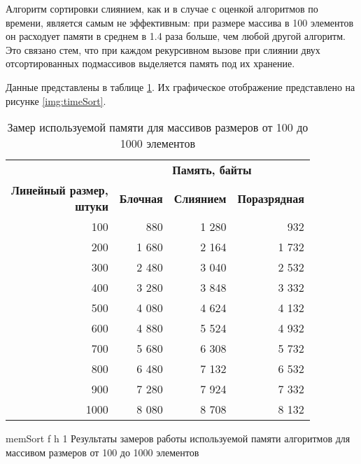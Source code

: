 Алгоритм сортировки слиянием, как и в случае с оценкой алгоритмов по времени,
является самым не эффективным: при размере массива в 100 элементов он расходует памяти в среднем в 1.4 раза больше, чем любой другой алгоритм. Это связано стем, что при каждом рекурсивном вызове при слиянии двух отсортированных подмассивов выделяется память под их хранение.

Данные представлены в таблице \ref{tbl:mem}. Их графическое отображение представлено на рисунке \ref{img:timeSort}.

\begin{table}[ht]
	\small
	\begin{center}
		\begin{threeparttable}
			\caption{Замер используемой памяти для массивов размеров от 100 до 1000 элементов}
			\label{tbl:mem}
			\begin{tabular}{|r|r|r|r|}
				\hline
				& \multicolumn{3}{c|}{\bfseries Память, байты} \\ \cline{2-4}
				\bfseries \makecell{Линейный размер, \\ штуки} & \bfseries Блочная & \bfseries Слиянием & \bfseries Поразрядная \\ \cline{2-4}
				\hline
				100 & 880 & 1 280 & 932 \\
				\hline
				200 & 1 680 & 2 164 & 1 732 \\
				\hline
				300 & 2 480 & 3 040 & 2 532 \\
				\hline
				400 & 3 280 & 3 848 & 3 332 \\
				\hline
				500 & 4 080 & 4 624 & 4 132 \\
				\hline
				600 & 4 880 & 5 524 & 4 932 \\
				\hline
				700 & 5 680 & 6 308 & 5 732 \\
				\hline
				800 & 6 480 & 7 132 & 6 532 \\
				\hline
				900 & 7 280 & 7 924 & 7 332 \\
				\hline
				1000 & 8 080 & 8 708 & 8 132 \\
				\hline
			\end{tabular}	
		\end{threeparttable}
	\end{center}
\end{table}

\clearpage

{memSort} %
{f} %
{h} %
{1\textwidth} %
{Результаты замеров работы используемой памяти алгоритмов для массивом размеров от 100 до 1000 элементов} %

